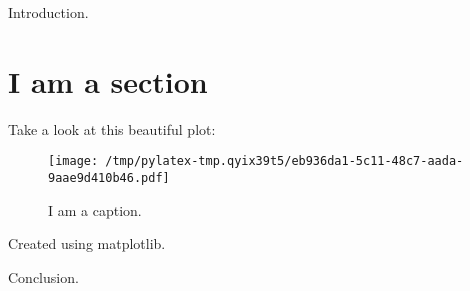 \documentclass{article}%
\begin{document}
%
\normalsize%
Introduction.%
\section{I am a section}%
\label{sec:Iamasection}%
Take a look at this beautiful plot:%


\begin{figure}[htbp]%
\centering%
\texttt{[image: /tmp/pylatex-tmp.qyix39t5/eb936da1-5c11-48c7-aada-9aae9d410b46.pdf]}%
\caption{I am a caption.}%
\end{figure}

%
Created using matplotlib.

%
Conclusion.%
\end{document}
